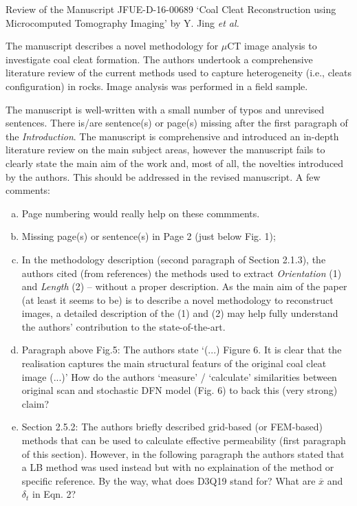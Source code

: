 \documentclass[14pt,twoside]{report}
\begin{document}
\afterpage{%
    \clearpage%
    \thispagestyle{empty}%
    \begin{landscape}%
        \centering %
        \vfill
    \end{landscape}
    \clearpage%
}
\vfill
\clearpage



\begin{center}
  {\Large Review of the Manuscript JFUE-D-16-00689 `Coal Cleat Reconstruction using Microcomputed Tomography Imaging' by Y. Jing {\it et al.}}
\end{center}

\medskip

The manuscript describes a novel methodology for $\mu$CT image analysis to investigate coal cleat formation. The authors undertook a comprehensive literature review of the current methods used to capture heterogeneity (i.e., cleats configuration) in rocks. Image analysis was performed in a field sample.

The manuscript is well-written with a small number of typos and unrevised sentences. There is/are sentence(s) or page(s) missing after the first paragraph of the {\it Introduction}. The manuscript is comprehensive and introduced an in-depth literature review on the main subject areas, however the manuscript fails to clearly state the main aim of the work and, most of all, the novelties introduced by the authors. This should be addressed in the revised manuscript.  A few comments:
\begin{enumerate}[(a)] 
%
    \item Page numbering would really help on these commments.
%
    \item Missing page(s) or sentence(s) in Page 2 (just below Fig. 1);
% 
    \item In the methodology description (second paragraph of Section 2.1.3), the authors cited (from references) the methods used to extract {\it Orientation} (1) and {\it Length} (2) -- without a proper description. As the main aim of the paper (at least it seems to be) is to describe a novel methodology to reconstruct images, a detailed description of the (1) and (2) may help fully understand the authors' contribution to the state-of-the-art.
%
    \item Paragraph above Fig.5: The authors state `(...) Figure 6. It is clear that the realisation captures the main structural featurs of the original coal cleat image (...)' How do the authors `measure' / `calculate' similarities between original scan and stochastic DFN model (Fig. 6) to back this (very strong) claim?
%
    \item Section 2.5.2: The authors briefly described grid-based (or FEM-based) methods that can be used to calculate effective permeability (first paragraph of this section). However, in the following paragraph the authors stated that a LB method was used instead but with no explaination of the method or specific reference. By the way, what does D3Q19 stand for? What are $\overline{x}$ and $\delta_{t}$ in Eqn. 2?
%
\end{enumerate}
\end{document}
